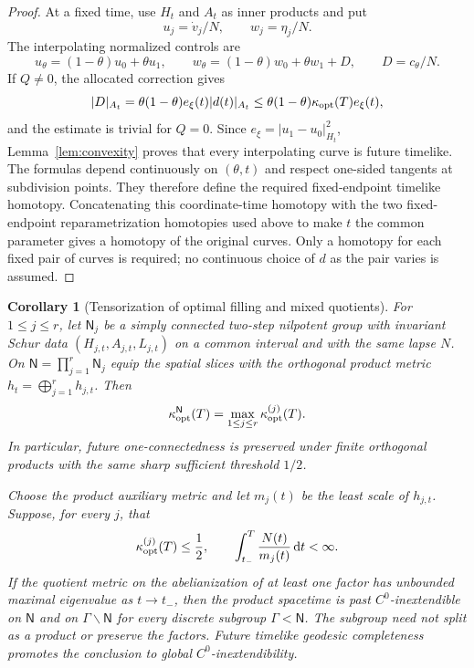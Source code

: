 \documentclass[10pt,a4paper]{article}
\numberwithin{equation}{section}
\newtheorem{corollary}[theorem]{Corollary}
\theoremstyle{definition}
\theoremstyle{remark}
\newcommand{\dd}{\mathrm d}
\begin{document}
\begin{proof}
At a fixed time, use $H_t$ and $A_t$ as inner products and put
\[
 u_j=\dot v_j/N,\qquad w_j=\eta_j/N.
\]
The interpolating normalized controls are
\[
 u_\theta=(1-\theta)u_0+\theta u_1,\qquad
 w_\theta=(1-\theta)w_0+\theta w_1+D,\qquad D=c_\theta/N.
\]
If $Q\ne0$, the allocated correction gives
\begin{equation}
 |D|_{A_t}=\theta(1-\theta)e_\xi(t)|d(t)|_{A_t}
 \le\theta(1-\theta)\kappa_{\rm opt}(T)e_\xi(t),
 \label{eq:correction-bound}
\end{equation}
and the estimate is trivial for $Q=0$.  Since
$e_\xi=|u_1-u_0|_{H_t}^2$, Lemma~\ref{lem:convexity} proves that every
interpolating curve is future timelike.  The formulas depend continuously on
$(\theta,t)$ and respect one-sided tangents at subdivision points.  They
therefore define the required fixed-endpoint timelike homotopy.
Concatenating this coordinate-time homotopy with the two fixed-endpoint
reparametrization homotopies used above to make $t$ the common parameter
gives a homotopy of the original curves.
Only a homotopy for each fixed pair of curves is required; no continuous
choice of $d$ as the pair varies is assumed.
\end{proof}

\begin{corollary}[Tensorization of optimal filling and mixed quotients]
\label{cor:optimal-product}
For $1\le j\le r$, let $\mathsf N_j$ be a simply connected two-step
nilpotent group with invariant Schur data
$(H_{j,t},A_{j,t},L_{j,t})$ on a common interval and with the same lapse
$N$.  On $\mathsf N=\prod_{j=1}^r\mathsf N_j$ equip the spatial slices
with the orthogonal product metric $h_t=\bigoplus_{j=1}^r h_{j,t}$.
Then
\begin{equation}
 \kappa_{\rm opt}^{\mathsf N}(T)
 =\max_{1\le j\le r}\kappa_{\rm opt}^{(j)}(T).
 \label{eq:optimal-product}
\end{equation}
In particular, future one-connectedness is preserved under finite
orthogonal products with the same sharp sufficient threshold $1/2$.

Choose the product auxiliary metric and let $m_j(t)$ be the least scale
of $h_{j,t}$.  Suppose, for every $j$, that
\[
 \kappa_{\rm opt}^{(j)}(T)\le\frac12,
 \qquad
 \int_{t_-}^{T}\frac{N(t)}{m_j(t)}\,\dd t<\infty.
\]
If the quotient metric on the abelianization of at least one factor has
unbounded maximal eigenvalue as $t\to t_-$, then the product spacetime is
past $C^0$-inextendible on $\mathsf N$ and on
$\Gamma\backslash\mathsf N$ for every discrete subgroup
$\Gamma<\mathsf N$.  The subgroup need not split as a product or
preserve the factors.  Future timelike geodesic completeness promotes
the conclusion to global $C^0$-inextendibility.
\end{corollary}
\end{document}
